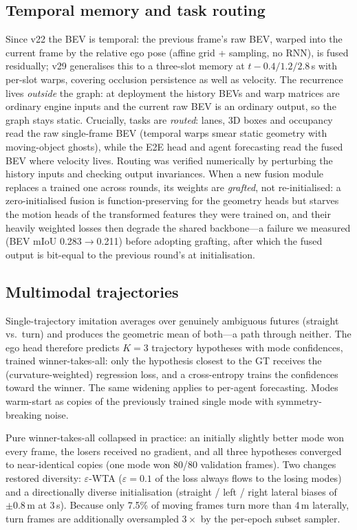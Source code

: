 \documentclass[10pt,twocolumn]{article}
\begin{document}
\subsection{Temporal memory and task routing}
Since v22 the BEV is temporal: the previous frame's raw BEV, warped into the
current frame by the relative ego pose (affine grid + sampling, no RNN), is
fused residually; v29 generalises this to a three-slot memory at
$t{-}0.4/1.2/2.8$\,s with per-slot warps, covering occlusion persistence as
well as velocity. The recurrence lives \emph{outside} the graph: at
deployment the history BEVs and warp matrices are ordinary engine inputs and
the current raw BEV is an ordinary output, so the graph stays static.
Crucially, tasks are \emph{routed}: lanes, 3D boxes and occupancy read the
raw single-frame BEV (temporal warps smear static geometry with
moving-object ghosts), while the E2E head and agent forecasting read the
fused BEV where velocity lives. Routing was verified numerically by
perturbing the history inputs and checking output invariances. When a new
fusion module replaces a trained one across rounds, its weights are
\emph{grafted}, not re-initialised: a zero-initialised fusion is
function-preserving for the geometry heads but starves the motion heads of
the transformed features they were trained on, and their heavily weighted
losses then degrade the shared backbone---a failure we measured (BEV mIoU
0.283$\to$0.211) before adopting grafting, after which the fused output is
bit-equal to the previous round's at initialisation.

\subsection{Multimodal trajectories}
Single-trajectory imitation averages over genuinely ambiguous futures
(straight vs.\ turn) and produces the geometric mean of both---a path
through neither. The ego head therefore predicts $K{=}3$ trajectory
hypotheses with mode confidences, trained winner-takes-all: only the
hypothesis closest to the GT receives the (curvature-weighted) regression
loss, and a cross-entropy trains the confidences toward the winner. The
same widening applies to per-agent forecasting. Modes warm-start as copies
of the previously trained single mode with symmetry-breaking noise.

Pure winner-takes-all collapsed in practice: an initially slightly better
mode won every frame, the losers received no gradient, and all three
hypotheses converged to near-identical copies (one mode won 80/80 validation
frames). Two changes restored diversity: $\varepsilon$-WTA
($\varepsilon{=}0.1$ of the loss always flows to the losing modes) and a
directionally diverse initialisation (straight / left / right lateral biases
of $\pm0.8$\,m at 3\,s). Because only 7.5\% of moving frames turn more than
4\,m laterally, turn frames are additionally oversampled $3\times$ by the
per-epoch subset sampler.
\end{document}
